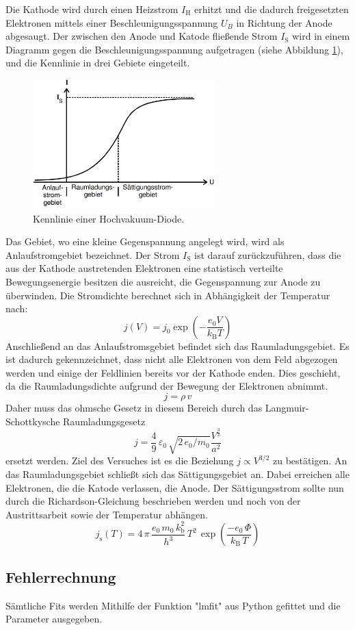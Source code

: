 Die Kathode wird durch einen Heizstrom $I_\text{H}$ erhitzt und die dadurch freigesetzten Elektronen mittels einer Beschleunigungsspannung $U_B$ in Richtung der Anode abgesaugt. Der zwischen den Anode und Katode fließende Strom $I_\text{S}$ wird in einem Diagramm gegen die Beschleunigungsspannung aufgetragen (siehe Abbildung \ref{fig:Ken}), und die Kennlinie in drei Gebiete eingeteilt.
\begin{figure}
  \centering
  \includegraphics[height=5cm]{picture/Kennlinie.png}
  \caption{Kennlinie einer Hochvakuum-Diode. \cite{pra}}
  \label{fig:Ken}
\end{figure}
Das Gebiet, wo eine kleine Gegenspannung angelegt wird, wird als Anlaufstromgebiet bezeichnet. Der Strom $I_\text{S}$ ist darauf zurückzuführen, dass die aus der Kathode austretenden Elektronen eine statistisch verteilte Bewegungsenergie besitzen die ausreicht, die Gegenspannung zur Anode zu überwinden. Die Stromdichte berechnet sich in Abhängigkeit der Temperatur nach:
\begin{equation}
  j(V) = j_0 \exp\left( - \frac{e_0 V}{k_\text{B} T} \right)
  \label{eqn:jv}
\end{equation}
Anschließend an das Anlaufstromsgebiet befindet sich das Raumladungsgebiet. Es ist dadurch gekennzeichnet, dass nicht alle Elektronen von dem Feld abgezogen werden und einige der Feldlinien bereits vor der Kathode enden. Dies geschieht, da die Raumladungsdichte aufgrund der Bewegung der Elektronen abnimmt.
\begin{equation}
  j = \rho\, v
  \label{eqn:j}
\end{equation}
Daher muss das ohmsche Gesetz in diesem Bereich durch das Langmuir-Schottkysche Raumladungsgesetz
\begin{equation}
  j = \frac{4}{9}\, \varepsilon_0\, \sqrt{2\, e_0/m_0}\frac{V^{\frac{3}{2}}}{a^2}
  \label{eqn:jLS}
\end{equation}
ersetzt werden. Ziel des Versuches ist es die Beziehung $j \propto V^{3/2}$ zu bestätigen.
An das Raumladungsgebiet schließt sich das Sättigungsgebiet an. Dabei erreichen alle  Elektronen, die die Katode verlassen, die Anode. Der Sättigungsstrom sollte nun durch die Richardson-Gleichung beschrieben werden und noch von der Austrittsarbeit sowie der Temperatur abhängen.
\begin{equation}
  j_\text{s} (T) = 4\, \pi\, \frac{e_0\, m_0\, k_\text{b}^2}{h^3}\, T^2\, \exp \left( \frac{-e_0\, \Phi}{k_\text{B}\, T} \right)
  \label{eqn:js}
\end{equation}

\subsection{Fehlerrechnung}
Sämtliche Fits werden Mithilfe der Funktion "lmfit" aus Python gefittet und die Parameter ausgegeben.
